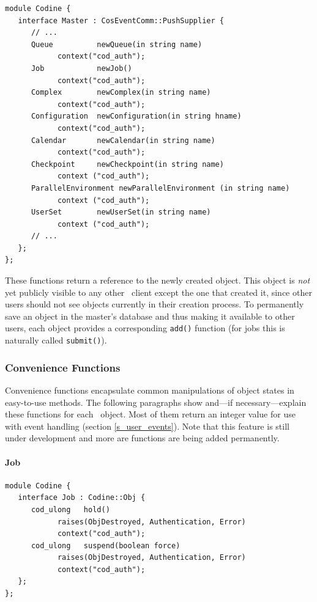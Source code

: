 \begin{Verbatim}[fontsize=\small, frame=single]
module Codine {
   interface Master : CosEventComm::PushSupplier {
      // ...
      Queue          newQueue(in string name)
            context("cod_auth");
      Job            newJob() 
            context("cod_auth");
      Complex        newComplex(in string name)
            context("cod_auth");
      Configuration  newConfiguration(in string hname)
            context("cod_auth");
      Calendar       newCalendar(in string name)
            context("cod_auth");
      Checkpoint     newCheckpoint(in string name)
            context ("cod_auth");
      ParallelEnvironment newParallelEnvironment (in string name)
            context ("cod_auth");
      UserSet        newUserSet(in string name)
            context ("cod_auth");
      // ...
   };
};
\end{Verbatim}

These functions return a reference to the newly created object. This
object is \emph{not} yet publicly visible to any other \codine\ client except
the one that created it, since other users should not see 
objects currently in their creation process. To permanently save an object in
the master's database and thus making it available to other users,
each object provides a corresponding \texttt{add()} function (for jobs
this is naturally called \texttt{submit()}).

\subsubsection{\label{s_user_convenience}Convenience Functions}
Convenience functions encapsulate common manipulations of object states in
easy-to-use methods. The following paragraphs show and---if 
necessary---ex\-plain
these functions for each \codine\ object. Most of them return an integer value
for use with event handling (section \ref{s_user_events}).
Note that this feature is still under development and more are functions are
being added permanently.

\paragraph{Job}
\begin{Verbatim}[fontsize=\small, frame=single]
module Codine {
   interface Job : Codine::Obj {
      cod_ulong   hold() 
            raises(ObjDestroyed, Authentication, Error)
            context("cod_auth");
      cod_ulong   suspend(boolean force)
            raises(ObjDestroyed, Authentication, Error)
            context("cod_auth");
   };
};
\end{Verbatim}

